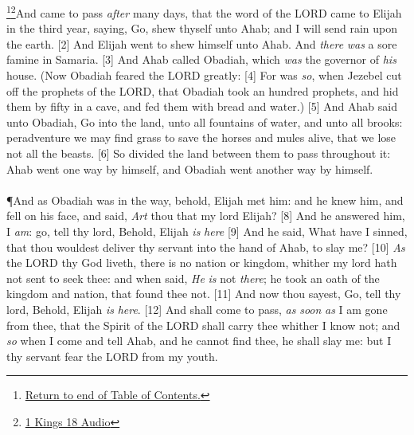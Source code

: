 \footnote{\textcolor[cmyk]{0.99998,1,0,0}{\hyperlink{TOC}{Return to end of Table of Contents.}}}\footnote{\href{https://audiobible.com/bible/1_kings_18.html}{\textcolor[cmyk]{0.99998,1,0,0}{1 Kings 18 Audio}}}\textcolor[cmyk]{0.99998,1,0,0}{And  came to pass \emph{after} many days, that the word of the LORD came to Elijah in the third year, saying, Go, shew thyself unto Ahab; and I will send rain upon the earth.}
[2] \textcolor[cmyk]{0.99998,1,0,0}{And Elijah went to shew himself unto Ahab. And \emph{there} \emph{was} a sore famine in Samaria.}
[3] \textcolor[cmyk]{0.99998,1,0,0}{And Ahab called Obadiah, which \emph{was} the governor of \emph{his} house. (Now Obadiah feared the LORD greatly:}
[4] \textcolor[cmyk]{0.99998,1,0,0}{For  was \emph{so}, when Jezebel cut off the prophets of the LORD, that Obadiah took an hundred prophets, and hid them by fifty in a cave, and fed them with bread and water.)}
[5] \textcolor[cmyk]{0.99998,1,0,0}{And Ahab said unto Obadiah, Go into the land, unto all fountains of water, and unto all brooks: peradventure we may find grass to save the horses and mules alive, that we lose not all the beasts.}
[6] \textcolor[cmyk]{0.99998,1,0,0}{So   divided the land between them to pass throughout it: Ahab went one way by himself, and Obadiah went another way by himself.}\\
\\
\P  \textcolor[cmyk]{0.99998,1,0,0}{And as Obadiah was in the way, behold, Elijah met him: and he knew him, and fell on his face, and said, \emph{Art} thou that my lord Elijah?}
[8] \textcolor[cmyk]{0.99998,1,0,0}{And he answered him, I \emph{am}: go, tell thy lord, Behold, Elijah \emph{is} \emph{here}}
[9] \textcolor[cmyk]{0.99998,1,0,0}{And he said, What have I sinned, that thou wouldest deliver thy servant into the hand of Ahab, to slay me?}
[10] \textcolor[cmyk]{0.99998,1,0,0}{\emph{As} the LORD thy God liveth, there is no nation or kingdom, whither my lord hath not sent to seek thee: and when   said, \emph{He} \emph{is} not \emph{there}; he took an oath of the kingdom and nation, that   found thee not.}
[11] \textcolor[cmyk]{0.99998,1,0,0}{And now thou sayest, Go, tell thy lord, Behold, Elijah \emph{is} \emph{here}.}
[12] \textcolor[cmyk]{0.99998,1,0,0}{And  shall come to pass, \emph{as} \emph{soon} \emph{as} I am gone from thee, that the Spirit of the LORD shall carry thee whither I know not; and \emph{so} when I come and tell Ahab, and he cannot find thee, he shall slay me: but I thy servant fear the LORD from my youth.}
